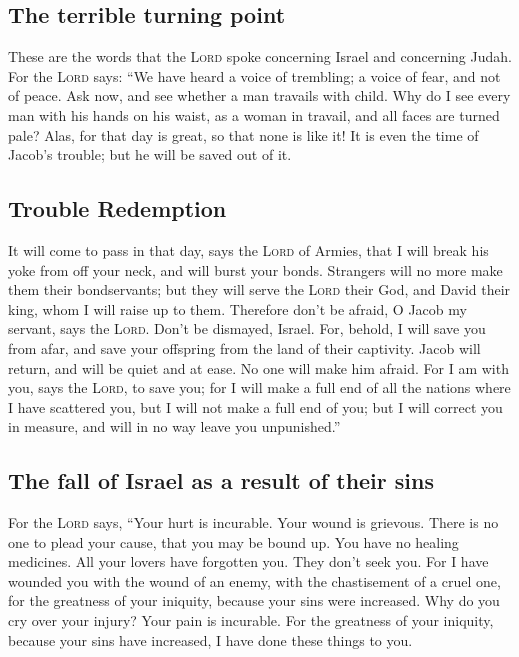 \hypertarget{the-terrible-turning-point}{%
\subsection{The terrible turning
point}\label{the-terrible-turning-point}}

 These are the words that the \textsc{Lord} spoke
concerning Israel and concerning Judah.  For the
\textsc{Lord} says: ``We have heard a voice of trembling; a voice of
fear, and not of peace.  Ask now, and see whether a man
travails with child. Why do I see every man with his hands on his waist,
as a woman in travail, and all faces are turned pale? 
Alas, for that day is great, so that none is like it! It is even the
time of Jacob's trouble; but he will be saved out of it.

\hypertarget{trouble-redemption}{%
\subsection{Trouble Redemption}\label{trouble-redemption}}

 It will come to pass in that day, says the \textsc{Lord}
of Armies, that I will break his yoke from off your neck, and will burst
your bonds. Strangers will no more make them their bondservants;
 but they will serve the \textsc{Lord} their God, and
David their king, whom I will raise up to them. 
Therefore don't be afraid, O Jacob my servant, says the \textsc{Lord}.
Don't be dismayed, Israel. For, behold, I will save you from afar, and
save your offspring from the land of their captivity. Jacob will return,
and will be quiet and at ease. No one will make him afraid.
 For I am with you, says the \textsc{Lord}, to save you;
for I will make a full end of all the nations where I have scattered
you, but I will not make a full end of you; but I will correct you in
measure, and will in no way leave you unpunished.''

\hypertarget{the-fall-of-israel-as-a-result-of-their-sins}{%
\subsection{The fall of Israel as a result of their
sins}\label{the-fall-of-israel-as-a-result-of-their-sins}}

 For the \textsc{Lord} says, ``Your hurt is incurable.
Your wound is grievous.  There is no one to plead your
cause, that you may be bound up. You have no healing medicines.
 All your lovers have forgotten you. They don't seek you.
For I have wounded you with the wound of an enemy, with the chastisement
of a cruel one, for the greatness of your iniquity, because your sins
were increased.  Why do you cry over your injury? Your
pain is incurable. For the greatness of your iniquity, because your sins
have increased, I have done these things to you.


